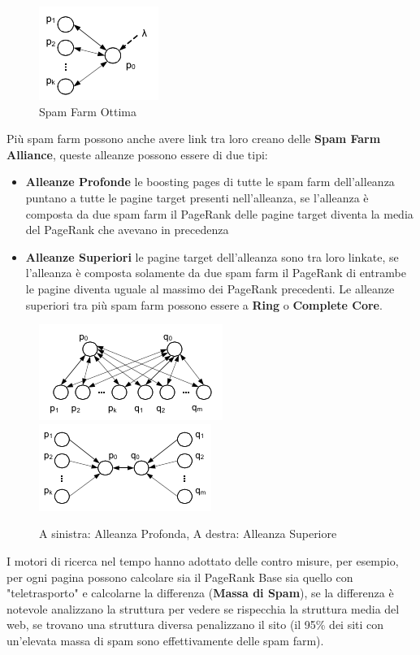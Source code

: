 \begin{figure}
\centering
\includegraphics{images/spamfarm_ottima.png}
\caption{Spam Farm Ottima}\label{fig:1}
\end{figure}
Più spam farm possono anche avere link tra loro creano delle \textbf{Spam Farm Alliance}, queste alleanze possono essere di due tipi:
\begin{itemize}
\item \textbf{Alleanze Profonde} le boosting pages di tutte le spam farm dell'alleanza puntano a tutte le pagine target presenti nell'alleanza, se l'alleanza è composta da due spam farm il PageRank delle pagine target diventa la media del PageRank che avevano in precedenza
\item \textbf{Alleanze Superiori} le pagine target dell'alleanza sono tra loro linkate, se l'alleanza è composta solamente da due spam farm il PageRank di entrambe le pagine diventa uguale al massimo dei PageRank precedenti. Le alleanze superiori tra più spam farm possono essere a \textbf{Ring} o \textbf{Complete Core}.
\end{itemize}

\begin{figure}
\includegraphics{images/alleanza_profonda.png}
\includegraphics{images/alleanza_sup.png}
\caption{A sinistra: Alleanza Profonda, A destra: Alleanza Superiore}\label{fig:2}
\end{figure}
I motori di ricerca nel tempo hanno adottato delle contro misure, per esempio, per ogni pagina possono calcolare sia il PageRank Base sia quello con "teletrasporto" e calcolarne la differenza (\textbf{Massa di Spam}), se la differenza è notevole analizzano la struttura per vedere se rispecchia la struttura media del web, se trovano una struttura diversa penalizzano il sito (il 95\% dei siti con un'elevata massa di spam sono effettivamente delle spam farm).


